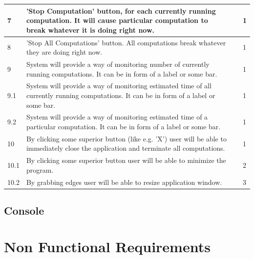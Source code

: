 \documentclass{article}
\begin{document}
\begin{center}
\begin{longtable}{| l | p{4cm} | p{3.5cm} | l |}
		7 & 
		'Stop Computation' button, for each currently running computation. It will cause 				particular computation to break whatever it is doing right now. & 
		 &
		1
		\\ \hline	
		
		8 & 
		'Stop All Computations' button. All computations break whatever they are doing right 			now. & 
		 &
		1
		\\ \hline		
		
		9 & 
		System will provide a way of monitoring number of currently running computations. It 			can be in form of a label or some bar. & 
		 &
		1
		\\ \hline	

		9.1 & 
		System will provide a way of monitoring estimated time of all currently running 				computations. It can be in form of a label or some bar. & 
		 &
		1
		\\ \hline

		9.2 & 
		System will provide a way of monitoring estimated time of a particular computation. It 			can be in form of a label or some bar. & 
		 &
		1
		\\ \hline

		10 & 
		By clicking some superior button (like e.g. 'X') user will be able to immediately 				close the application and terminate all computations.  & 
		 &
		1
		\\ \hline
	
		10.1 & 
		By clicking some superior button user will be able to minimize the program. & 
		 &
		2
		\\ \hline	

		10.2 & 
		By grabbing edges user will be able to resize application window. & 
		 &
		3
		\\ \hline
		
	\end{longtable}
\end{center}	

\subsection{Console}


\newpage

%
%
\section{Non Functional Requirements}

%
%
\end{document}
